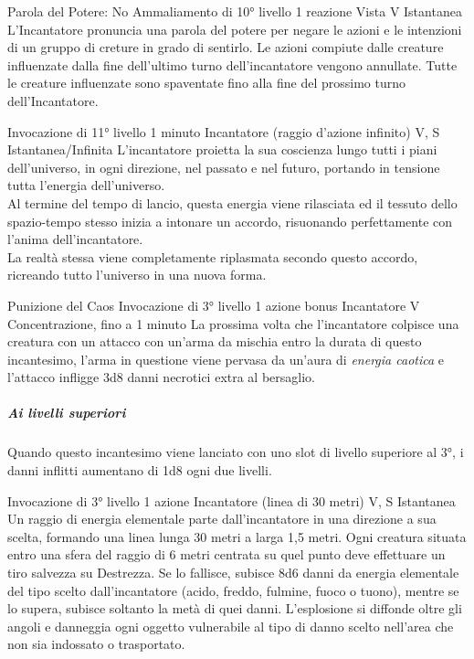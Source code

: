 \DndSpellHeader%
  {Parola del Potere: No}
  {Ammaliamento di 10° livello}
  {1 reazione}
  {Vista}
  {V}
  {Istantanea}
L'Incantatore pronuncia una parola del potere per negare le azioni e le intenzioni di un gruppo di creture in grado di sentirlo.
Le azioni compiute dalle creature influenzate dalla fine dell'ultimo turno dell'incantatore vengono annullate.
Tutte le creature influenzate sono spaventate fino alla fine del prossimo turno dell'Incantatore.

{Invocazione di 11° livello}
{1 minuto}
{Incantatore (raggio d'azione infinito)}
{V, S}
{Istantanea/Infinita}
L'incantatore proietta la sua coscienza lungo tutti i piani dell'universo, in ogni direzione, nel passato e nel futuro, portando in tensione tutta l'energia dell'universo. \\ Al termine del tempo di lancio, questa energia viene rilasciata ed il tessuto dello spazio-tempo stesso inizia a intonare un accordo, risuonando perfettamente con l'anima dell'incantatore. \\ La realtà stessa viene completamente riplasmata secondo questo accordo, ricreando tutto l'universo in una nuova forma.

\DndSpellHeader%
  {Punizione del Caos}
  {Invocazione di 3° livello}
  {1 azione bonus}
  {Incantatore}
  {V}
  {Concentrazione, fino a 1 minuto}
La prossima volta che l'incantatore colpisce una creatura con un attacco con un'arma da mischia entro la durata di questo incantesimo, l'arma in questione viene pervasa da un'aura di \textit{energia caotica} e l'attacco infligge 3d8 danni necrotici extra al bersaglio. 
\subparagraph{Ai livelli superiori}Quando questo incantesimo viene lanciato con uno slot di livello superiore al 3°, i danni inflitti aumentano di 1d8 ogni due livelli.

{Invocazione di 3° livello}
{1 azione}
{Incantatore (linea di 30 metri)}
{V, S}
{Istantanea}
Un raggio di energia elementale parte dall'incantatore in una direzione a sua scelta, formando una linea lunga 30 metri a larga 1,5 metri. Ogni creatura situata entro una sfera del raggio di 6 metri centrata su quel punto deve effettuare un tiro salvezza su Destrezza. Se lo fallisce, subisce 8d6 danni da  energia elementale del tipo scelto dall'incantatore (acido, freddo, fulmine, fuoco o tuono), mentre se lo supera, subisce soltanto la metà di quei danni. 
L'esplosione si diffonde oltre gli angoli e danneggia ogni oggetto vulnerabile al tipo di danno scelto nell'area che non sia indossato o trasportato.

